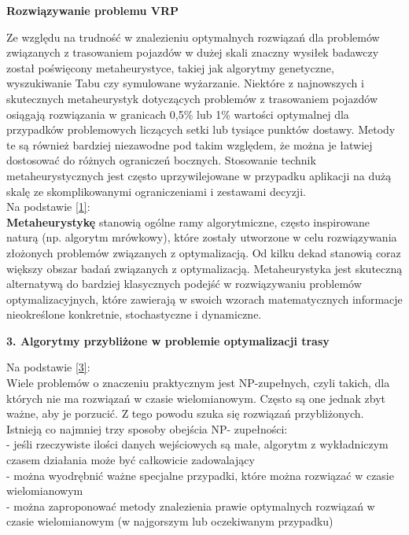 \documentclass[a4paper, twoside, 12pt, justified]{article}
\begin{document}
	
	\begin{large}
		\begin{center}
			\textbf{Rozwiązywanie problemu VRP}
		\end{center}
	\end{large} 
	
	Ze względu na trudność w znalezieniu optymalnych rozwiązań dla problemów związanych z trasowaniem pojazdów w dużej skali znaczny wysiłek badawczy został poświęcony metaheurystyce, takiej jak algorytmy genetyczne, wyszukiwanie Tabu czy symulowane wyżarzanie. Niektóre z najnowszych i skutecznych metaheurystyk dotyczących problemów z trasowaniem pojazdów osiągają rozwiązania w granicach 0,5\% lub 1\% wartości optymalnej dla przypadków problemowych liczących setki lub tysiące punktów dostawy. Metody te są również bardziej niezawodne pod takim względem, że można je łatwiej dostosować do różnych ograniczeń bocznych. Stosowanie technik metaheurystycznych jest często uprzywilejowane w przypadku aplikacji na dużą skalę ze skomplikowanymi ograniczeniami i zestawami decyzji.\\
	
	Na podstawie \hyperlink{metaheurystyka}{[1]}:\\ 
	\textbf{Metaheurystykę} stanowią ogólne ramy algorytmiczne, często inspirowane naturą (np. algorytm mrówkowy), które zostały utworzone w celu rozwiązywania złożonych problemów związanych z optymalizacją. Od kilku dekad stanowią coraz większy obszar badań związanych z optymalizacją. Metaheurystyka jest skuteczną alternatywą
	do bardziej klasycznych podejść w rozwiązywaniu problemów optymalizacyjnych, które zawierają w swoich wzorach matematycznych informacje nieokreślone konkretnie, stochastyczne i dynamiczne.\\
	

	
	\newpage
	
	
	\begin{flushleft}
		\begin{LARGE}
			\textbf{3. Algorytmy przybliżone w problemie
				optymalizacji trasy}
		\end{LARGE}
	\end{flushleft}
	
	\vspace{5mm} %

	Na podstawie \hyperlink{algorithm}{[3]}:\\
	Wiele problemów o znaczeniu praktycznym jest NP-zupełnych, czyli takich, dla których nie ma rozwiązań w czasie wielomianowym. Często są one jednak zbyt ważne, aby je porzucić. Z tego powodu szuka się rozwiązań przybliżonych. Istnieją co najmniej trzy sposoby obejścia NP- zupełności:\\
	- jeśli rzeczywiste ilości danych wejściowych są małe,
	algorytm z wykładniczym czasem działania może być całkowicie zadowalający\\
	- można wyodrębnić ważne specjalne przypadki, które można rozwiązać w czasie wielomianowym\\
	- można zaproponować metody znalezienia prawie optymalnych rozwiązań w czasie wielomianowym (w najgorszym lub oczekiwanym przypadku)\\
	
\end{document}
